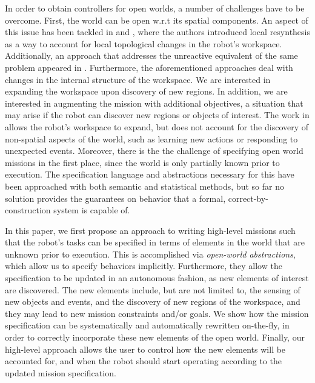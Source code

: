 In order to obtain controllers for open worlds, a number of challenges have to be overcome. 
First, the world can be open w.r.t its spatial components. An aspect of this issue has been tackled in \cite{MurrayICRA2012} and \cite{MurrayICRA2013a}, where the authors introduced local resynthesis as a way to account for local topological changes in the robot's workspace. 
Additionally, an approach that addresses the unreactive equivalent of the same problem appeared in \cite{Dimos2013ICRA}. 
Furthermore, the aforementioned approaches deal with changes in the internal structure of the workspace. We are interested in expanding the workspace upon discovery of new regions.
In addition, we are interested in augmenting the mission with additional objectives, a situation that may arise if the robot can discover new regions or objects of interest. 
The work in \cite{BingxinRSS2012} allows the robot's workspace to expand, but does not account for the discovery of non-spatial aspects of the world, such as learning new actions or responding to unexpected events.
Moreover, there is the the challenge of specifying open world missions in the first place, since the world is only partially known prior to execution. The specification language and abstractions necessary for this have been approached with both semantic \cite{Joshi2012, MatthiasAI2010} and statistical \cite{Tellex2011} methods, but so far no solution provides the guarantees on behavior that a formal, correct-by-construction system is capable of. %

In this paper, we first propose an approach to writing high-level missions such that the robot's tasks can be specified in terms of elements in the world that are unknown prior to execution. This is accomplished via \emph{open-world abstractions}, which allow us to specify behaviors implicitly. 
Furthermore, they allow the specification to be updated in an autonomous fashion, as new elements of interest are discovered. The new elements include, but are not limited to, the sensing of new objects and events, and the discovery of new regions of the workspace, and they may lead to new mission constraints and/or goals.
We show how the mission specification can be systematically and automatically rewritten on-the-fly, in order to correctly incorporate these new elements of the open world. 
Finally, our high-level approach allows the user to control how the new elements will be accounted for, and when the robot should start operating according to the updated mission specification.

